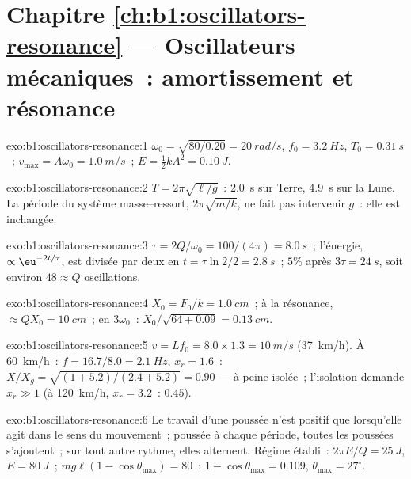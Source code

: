 \section*{Chapitre \ref{ch:b1:oscillators-resonance} --- Oscillateurs mécaniques~: amortissement et résonance}

\begin{solution}{exo:b1:oscillators-resonance:1}
$\omega_0 = \sqrt{80/0.20} = \qty{20}{rad/s}$, $f_0 = \qty{3.2}{Hz}$, $T_0 =
\qty{0.31}{s}$~; $v_{\max} = A\omega_0 = \qty{1.0}{m/s}$~; $E = \tfrac12 kA^2 =
\qty{0.10}{J}$.
\end{solution}

\begin{solution}{exo:b1:oscillators-resonance:2}
$T = 2\pi\sqrt{\ell/g}$~: \qty{2.0}{s} sur Terre, \qty{4.9}{s} sur la Lune.
La période du système masse--ressort, $2\pi\sqrt{m/k}$, ne fait pas
intervenir $g$~: elle est inchangée.
\end{solution}

\begin{solution}{exo:b1:oscillators-resonance:3}
$\tau = 2Q/\omega_0 = 100/(4\pi) = \qty{8.0}{s}$~; l'énergie, $\propto \eu^{-2t/\tau}$,
est divisée par deux en $t = \tau\ln2/2 = \qty{2.8}{s}$~; $5\%$ après $3\tau = \qty{24}{s}$,
soit environ $48 \approx Q$ oscillations.
\end{solution}

\begin{solution}{exo:b1:oscillators-resonance:4}
$X_0 = F_0/k = \qty{1.0}{cm}$~; à la résonance, $\approx QX_0 = \qty{10}{cm}$~;
en $3\omega_0$~: $X_0/\sqrt{64 + 0.09} = \qty{0.13}{cm}$.
\end{solution}

\begin{solution}{exo:b1:oscillators-resonance:5}
$v = Lf_0 = 8.0 \times 1.3 = \qty{10}{m/s}$ (\qty{37}{km/h}). À
\qty{60}{km/h}~: $f = 16.7/8.0 = \qty{2.1}{Hz}$, $x_r = 1.6$~: $X/X_g =
\sqrt{(1 + 5.2)/(2.4 + 5.2)} = 0.90$ --- à peine isolée~; l'isolation
demande $x_r \gg 1$ (à \qty{120}{km/h}, $x_r = 3.2$~: $0.45$).
\end{solution}

\begin{solution}{exo:b1:oscillators-resonance:6}
Le travail d'une poussée n'est positif que lorsqu'elle agit dans le sens
du mouvement~; poussée à chaque période, toutes les poussées
s'ajoutent~; sur tout autre rythme, elles alternent. Régime établi~:
$2\pi E/Q = \qty{25}{J}$, $E = \qty{80}{J}$~;
$mg\ell(1 - \cos\theta_{\max}) = 80$~: $1 - \cos\theta_{\max} = 0.109$,
$\theta_{\max} = 27^\circ$.
\end{solution}

